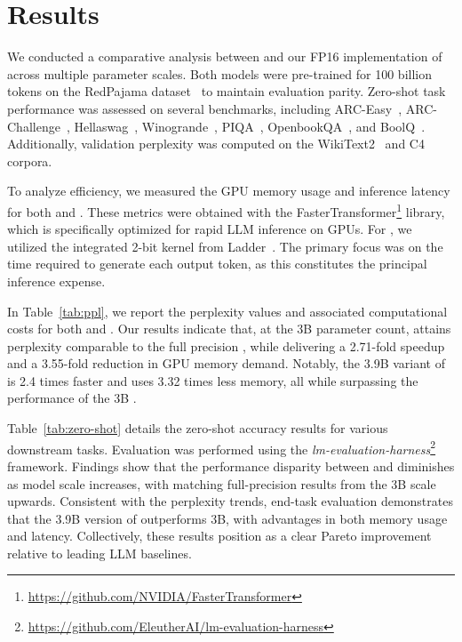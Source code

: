 \section{Results}

We conducted a comparative analysis between  and our FP16 implementation of  across multiple parameter scales. Both models were pre-trained for 100 billion tokens on the RedPajama dataset~\cite{redpajama} to maintain evaluation parity. Zero-shot task performance was assessed on several benchmarks, including ARC-Easy~\cite{arc}, ARC-Challenge~\cite{arc}, Hellaswag~\cite{hellaswag}, Winogrande~\cite{winoGrande}, PIQA~\cite{piqa}, OpenbookQA~\cite{openbookqa}, and BoolQ~\cite{boolq}. Additionally, validation perplexity was computed on the WikiText2~\cite{wikitext2} and C4~\cite{c4} corpora.

To analyze efficiency, we measured the GPU memory usage and inference latency for both  and . These metrics were obtained with the FasterTransformer\footnote{\url{https://github.com/NVIDIA/FasterTransformer}} library, which is specifically optimized for rapid LLM inference on GPUs. For , we utilized the integrated 2-bit kernel from Ladder~\cite{ladder}. The primary focus was on the time required to generate each output token, as this constitutes the principal inference expense.

In Table~\ref{tab:ppl}, we report the perplexity values and associated computational costs for both  and . Our results indicate that, at the 3B parameter count,  attains perplexity comparable to the full precision , while delivering a 2.71-fold speedup and a 3.55-fold reduction in GPU memory demand. Notably, the 3.9B variant of  is 2.4 times faster and uses 3.32 times less memory, all while surpassing the performance of the 3B .

Table~\ref{tab:zero-shot} details the zero-shot accuracy results for various downstream tasks. Evaluation was performed using the \emph{lm-evaluation-harness}\footnote{\url{https://github.com/EleutherAI/lm-evaluation-harness}} framework. Findings show that the performance disparity between  and  diminishes as model scale increases, with  matching full-precision results from the 3B scale upwards. Consistent with the perplexity trends, end-task evaluation demonstrates that the 3.9B version of  outperforms  3B, with advantages in both memory usage and latency. Collectively, these results position  as a clear Pareto improvement relative to leading LLM baselines.

